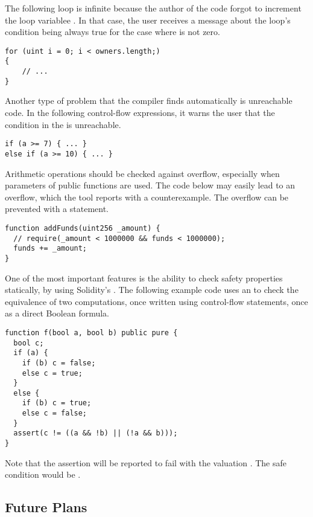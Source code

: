 The following loop is infinite because the author of the code
forgot to increment the loop variablee .
%
In that case, the user receives a message about the loop's condition being
always true for the case where  is not zero.

\begin{verbatim}
for (uint i = 0; i < owners.length;)
{
    // ...
}
\end{verbatim}

Another type of problem that the compiler finds automatically is unreachable
code.
%
In the following control-flow expressions, it warns the user that the condition
in the  is unreachable.

\begin{verbatim}
if (a >= 7) { ... }
else if (a >= 10) { ... }
\end{verbatim}

Arithmetic operations should be checked against overflow, especially when
parameters of public functions are used.
%
The code below may easily lead to an overflow, which the tool reports with a
counterexample.
%
The overflow can be prevented with a  statement.

\begin{verbatim}
function addFunds(uint256 _amount) {
  // require(_amount < 1000000 && funds < 1000000);
  funds += _amount;
}
\end{verbatim}

One of the most important features is the ability to check safety properties
statically, by using Solidity's .
%
The following example code uses an  to check the equivalence of
two computations, once written using control-flow statements, once as a direct
Boolean formula.

\begin{verbatim}
function f(bool a, bool b) public pure {
  bool c;
  if (a) {
    if (b) c = false;
    else c = true;
  }
  else {
    if (b) c = true;
    else c = false;
  }
  assert(c != ((a && !b) || (!a && b)));
}
\end{verbatim}

Note that the assertion will be reported to fail with the valuation
.
%
The safe condition would be
.

\subsection{Future Plans}

